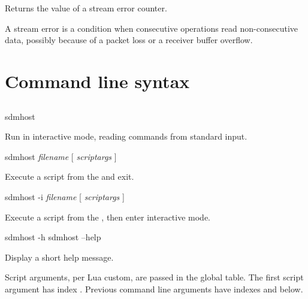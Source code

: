 \documentclass[a4paper,12pt,twoside,extrafontsizes]{memoir}
\begin{document}
\begin{funcret}
	Returns the value of a stream error counter.
\end{funcret}

\begin{funcremarks}
	A stream error is a condition when consecutive operations read non-consecutive data, possibly because of a packet loss or a receiver buffer overflow.
\end{funcremarks}

\appendix

\chapter{Command line syntax}
\label{app:cmdline}

\section[sdmhost]{}

\begin{shellcmds}
sdmhost
\end{shellcmds}

Run  in interactive mode, reading commands from standard input.

\begin{shellcmds}
sdmhost \emph{filename} [ \emph{scriptargs} ]
\end{shellcmds}

Execute a script from the  and exit.

\begin{shellcmds}
sdmhost -i \emph{filename} [ \emph{scriptargs} ]
\end{shellcmds}

Execute a script from the , then enter interactive mode.

\begin{shellcmds}
sdmhost -h
sdmhost --help
\end{shellcmds}

Display a short help message.

Script arguments, per Lua custom, are passed in the  global table. The first script argument has index . Previous command line arguments have indexes  and below.

\section[sdmconsole]{}
\end{document}
